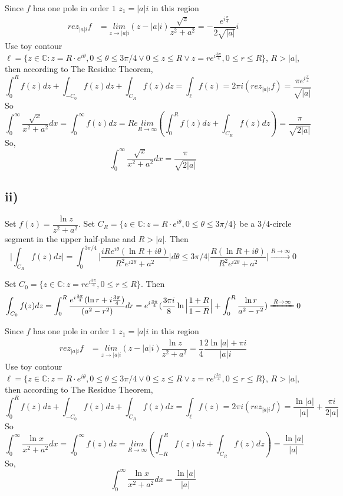 \documentclass[a4paper,12pt,titlepage]{article}
\begin{document}
Since $f$ has one pole in order $1$ $z_1=|a|i$ in this region
\begin{align*}
rez_{|a|i}f&=\underset{z\rightarrow |a|i}{lim}(z-|a|i)\dfrac{\sqrt{z}}{z^2+a^2}=-\dfrac{e^{i\frac{\pi}{4}}}{2\sqrt{|a|}}i
\end{align*}
Use toy contour $\ell= \lbrace z \in \mathbb{C}: z = R\cdot e^{i\theta}, 0 \leqslant \theta \leqslant 3\pi/4 \vee 0\leqslant z\leqslant R\vee z = r e^{i\frac{3\pi}{4}}, 0 \leqslant r\leqslant R\rbrace$, $R>|a|$, then according to The Residue Theorem, 
$$\int_{0}^Rf(z)dz+\int_{-C_0}f(z)dz+\int_{C_R}f(z)dz=\int_{\ell}f(z)=2\pi i(rez_{|a|i}f)=\dfrac{\pi e^{i\frac{\pi}{4}}}{\sqrt{|a|}}$$
So
$$\int_{0}^{\infty}\dfrac{\sqrt{x}}{x^2+a^2}dx=\int_{0}^{\infty}f(z)dz=Re\underset{R\rightarrow \infty}{lim}(\int_{0}^Rf(z)dz+\int_{C_R}f(z)dz)=\dfrac{\pi}{\sqrt{2|a|}}$$
So,
$$\int_{0}^{\infty}\dfrac{\sqrt{x}}{x^2+a^2}dx=\dfrac{\pi}{\sqrt{2|a|}}$$

\subsection*{ii)}
Set $f(z)=\dfrac{\ln z}{z^2+a^2}$. 
Set $C_R = \lbrace z \in \mathbb{C}: z = R\cdot e^{i\theta}, 0 \leqslant \theta \leqslant 3\pi/4\rbrace$ be a $3/4$-circle segment in the upper half-plane and $R>|a|$.  Then
$$\Big|\int_{C_R}f(z)dz\Big|=\int_0^{3\pi/4}\Big|\dfrac{iRe^{i\theta}(\ln R+i\theta)}{R^2e^{i2\theta}+a^2}\Big|d\theta\leqslant3\pi/4\Big|\dfrac{R(\ln R+i\theta)}{R^2e^{i2\theta}+a^2}\Big|\xrightarrow{R\rightarrow\infty}0$$

Set $C_0 = \lbrace z \in \mathbb{C}: z = r e^{i\frac{3\pi}{4}}, 0 \leqslant r\leqslant R\rbrace$.  Then
$$\int_{C_0}f(z)dz=\int_0^{R}\dfrac{e^{i\frac{3\pi}{4}}(\ln r+i\frac{3\pi}{4})}{(a^2-r^2)}dr=e^{i\frac{3\pi}{4}}(\dfrac{3\pi i}{8}\ln\Big|\dfrac{1+R}{1-R}\Big|+\int_0^R\dfrac{\ln r}{a^2-r^2})\xlongequal{R\rightarrow \infty}0$$

Since $f$ has one pole in order $1$ $z_1=|a|i$ in this region
\begin{align*}
rez_{|a|i}f&=\underset{z\rightarrow |a|i}{lim}
(z-|a|i)\dfrac{\ln z}{z^2+a^2}=\dfrac{1}{4}\dfrac{2\ln |a|+\pi i}{|a|i}
\end{align*}
Use toy contour $\ell= \lbrace z \in \mathbb{C}: z = R\cdot e^{i\theta}, 0 \leqslant \theta \leqslant 3\pi/4 \vee 0\leqslant z\leqslant R\vee z = r e^{i\frac{3\pi}{4}}, 0 \leqslant r\leqslant R\rbrace$, $R>|a|$, then according to The Residue Theorem, 
$$\int_{0}^Rf(z)dz+\int_{-C_0}f(z)dz+\int_{C_R}f(z)dz=\int_{\ell}f(z)=2\pi i(rez_{|a|i}f)=\dfrac{\ln |a|}{|a|}+\dfrac{\pi i}{2|a|}$$
So
$$\int_{0}^{\infty}\dfrac{\ln x}{x^2+a^2}dx=\int_{0}^{\infty}f(z)dz=\underset{R\rightarrow \infty}{lim}(\int_{-R}^Rf(z)dz+\int_{C_R}f(z)dz)=\dfrac{\ln |a|}{|a|}$$
So,
$$\int_{0}^{\infty}\dfrac{\ln x}{x^2+a^2}dx=\dfrac{\ln |a|}{|a|}$$
\end{document}
